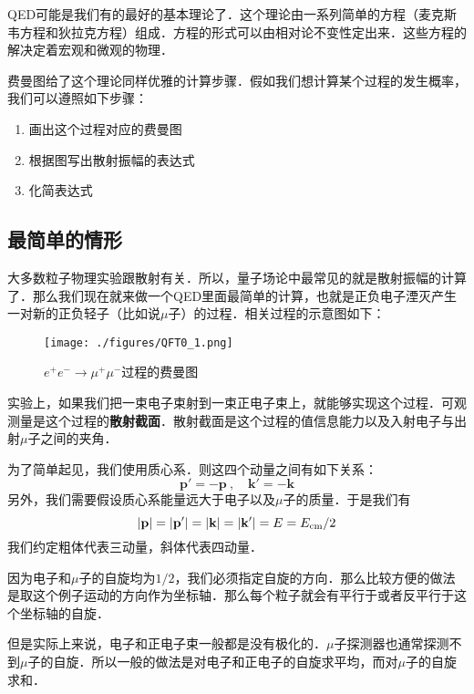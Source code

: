 

QED可能是我们有的最好的基本理论了．这个理论由一系列简单的方程（麦克斯韦方程和狄拉克方程）组成．方程的形式可以由相对论不变性定出来．这些方程的解决定着宏观和微观的物理．

费曼图给了这个理论同样优雅的计算步骤．假如我们想计算某个过程的发生概率，我们可以遵照如下步骤：

\begin{enumerate}
\item 画出这个过程对应的费曼图
\item 根据图写出散射振幅的表达式
\item 化简表达式
\end{enumerate}

\subsection{最简单的情形}
大多数粒子物理实验跟散射有关．所以，量子场论中最常见的就是散射振幅的计算了．那么我们现在就来做一个QED里面最简单的计算，也就是正负电子湮灭产生一对新的正负轻子（比如说$\mu$子）的过程．相关过程的示意图如下：

\begin{figure}[ht]
\centering
\texttt{[image: ./figures/QFT0\_1.png]}
\caption{$e^+e^-\rightarrow\mu^+\mu^-$过程的费曼图} \label{QFT0_fig1}
\end{figure}

实验上，如果我们把一束电子束射到一束正电子束上，就能够实现这个过程．可观测量是这个过程的\textbf{散射截面}．散射截面是这个过程的值信息能力以及入射电子与出射$\mu$子之间的夹角．

为了简单起见，我们使用质心系．则这四个动量之间有如下关系：
\begin{equation}
\mathbf p' = - \mathbf p~, \quad \mathbf k'=-\mathbf k
\end{equation}
另外，我们需要假设质心系能量远大于电子以及$\mu$子的质量．于是我们有
\begin{equation}
|\mathbf p| = |\mathbf p'| = |\mathbf k| = |\mathbf k'| = E = E_{\rm cm}/2
\end{equation}
我们约定粗体代表三动量，斜体代表四动量．

因为电子和$\mu$子的自旋均为$1/2$，我们必须指定自旋的方向．那么比较方便的做法是取这个例子运动的方向作为坐标轴．那么每个粒子就会有平行于或者反平行于这个坐标轴的自旋．

但是实际上来说，电子和正电子束一般都是没有极化的．$\mu$子探测器也通常探测不到$\mu$子的自旋．所以一般的做法是对电子和正电子的自旋求平均，而对$\mu$子的自旋求和．

